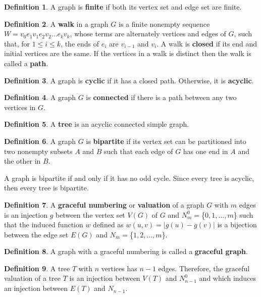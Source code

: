 \documentclass[12pt]{report}
\theoremstyle{definition}
\newtheorem{define}{\indent Definition}[chapter]
\def\indent{\hspace*{.5cm}}
\begin{document}
\begin{define} A graph is \textbf{finite} if both its vertex set and edge set are finite.
\end{define}

\begin{define}
    A \textbf{walk} in a graph $G$ is a finite nonempty sequence $W=v_0 e_1 v_1 e_2 v_2 \dots e_k v_k$, whose terms are alternately vertices and edges of $G$, such that, for $1\leq i\leq k$, the ends of $e_i$ are $v_{i-1}$ and $v_i$. A walk is \textbf{closed} if its end and initial vertices are the same. If the vertices in a walk is distinct then the walk is called a \textbf{path}.
\end{define}

\begin{define} A graph is \textbf{cyclic} if it has a closed path. Otherwise, it is \textbf{acyclic}.
\end{define}

\begin{define} A graph $G$ is \textbf{connected} if there is a path between any two vertices in $G$.
\end{define}

\begin{define} A \textbf{tree} is an acyclic connected simple graph. 
\end{define}

\begin{define} A graph $G$ is \textbf{bipartite} if its vertex set can be partitioned into two nonempty subsets $A$ and $B$ such that each edge of $G$ has one end in $A$ and the other in $B$.
\end{define}
\indent
\indent A graph is bipartite if and only if it has no odd cycle. Since every tree is acyclic, then every tree is bipartite.


\begin{define} A \textbf{graceful numbering} or \textbf{valuation} of a graph $G$ with $m$ edges is an injection $g$ between the vertex set $V(G)$ of $G$ and $N_m^0=$\{$0,1,\dots,m$\} such that the induced function $w$ defined as $w(u,v)=|g(u)-g(v)|$ is a bijection between the edge set $E(G)$ and $N_m=$\{$1,2,\dots,m$\}.
\end{define}

\begin{define} A graph with a graceful numbering is called a \textbf{graceful graph}.
\end{define}

\begin{define} A tree $T$ with $n$ vertices has $n-1$ edges. Therefore, the graceful valuation of a tree $T$ is an injection between $V(T)$ and $N_{n-1}^0$ and which induces an injection between $E(T)$ and $N_{n-1}$.
\end{define}
\end{document}
